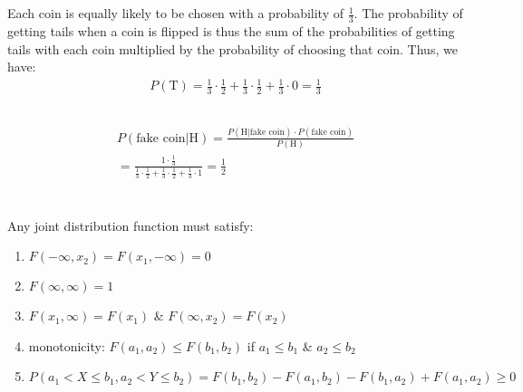 \documentclass[11pt,a4paper,margin=1in]{article}
\begin{document}
\section{}
    \subsection{}
        Each coin is equally likely to be chosen with a probability of $\frac{1}{3}$.
        The probability of getting tails when a coin is flipped is thus the sum
        of the probabilities of getting tails with each coin multiplied by the probability
        of choosing that coin. Thus, we have:
        \begin{gather*}
            P(\text{T}) = \frac{1}{3} \cdot \frac{1}{2} + \frac{1}{3} \cdot \frac{1}{2} + \frac{1}{3} \cdot 0 = \frac{1}{3}
        \end{gather*}
    \subsection{}
        \begin{gather*}
            P(\text{fake coin} | \text{H}) = \frac{P(\text{H} | \text{fake coin}) \cdot P(\text{fake coin})}{P(\text{H})}\\
            = \frac{1 \cdot \frac{1}{3}}{\frac{1}{3} \cdot \frac{1}{2} + \frac{1}{3} \cdot \frac{1}{2} + \frac{1}{3} \cdot 1} = \frac{1}{2}
        \end{gather*}

\section{}
    Any joint distribution function must satisfy:
    \begin{enumerate}[1.]
        \item $F(-\infty, x_2) = F(x_1, -\infty) = 0$
        \item $F(\infty, \infty) = 1$
        \item $F(x_1, \infty) = F(x_1)$ \& $F(\infty, x_2) = F(x_2)$
        \item monotonicity: $F(a_1, a_2) \leq F(b_1, b_2)$ if $a_1 \leq b_1$ \& $a_2 \leq b_2$
        \item $P(a_1 < X \leq b_1, a_2 < Y \leq b_2) = F(b_1, b_2) - F(a_1, b_2) - F(b_1, a_2) + F(a_1, a_2) \geq 0$
    \end{enumerate}
\end{document}
